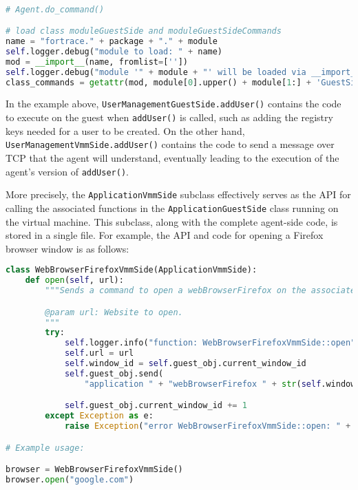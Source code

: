 \documentclass[letterpaper,12pt]{report}
\newcommand{\passthrough}[1]{#1}
\begin{document}
\begin{lstlisting}[language=Python]

# Agent.do_command()

# load class moduleGuestSide and moduleGuestSideCommands
name = "fortrace." + package + "." + module
self.logger.debug("module to load: " + name)
mod = __import__(name, fromlist=[''])
self.logger.debug("module '" + module + "' will be loaded via __import__")
class_commands = getattr(mod, module[0].upper() + module[1:] + 'GuestSideCommands')
\end{lstlisting}

In the example above,
\passthrough{\lstinline!UserManagementGuestSide.addUser()!} contains the
code to execute on the guest when \passthrough{\lstinline!addUser()!} is
called, such as adding the registry keys needed for a user to be
created. On the other hand,
\passthrough{\lstinline!UserManagementVmmSide.addUser()!} contains the
code to send a message over TCP that the agent will understand,
eventually leading to the execution of the agent's version of
\passthrough{\lstinline!addUser()!}.

More precisely, the \passthrough{\lstinline!ApplicationVmmSide!}
subclass effectively serves as the API for calling the associated
functions in the \passthrough{\lstinline!ApplicationGuestSide!} class
running on the virtual machine. This subclass, along with the complete
agent-side code, is stored in a single file. For example, the API and
code for opening a Firefox browser window is as follows:

\begin{lstlisting}[language=Python]
class WebBrowserFirefoxVmmSide(ApplicationVmmSide):
    def open(self, url):
        """Sends a command to open a webBrowserFirefox on the associated guest.

        @param url: Website to open.
        """
        try:
            self.logger.info("function: WebBrowserFirefoxVmmSide::open")
            self.url = url
            self.window_id = self.guest_obj.current_window_id
            self.guest_obj.send(
                "application " + "webBrowserFirefox " + str(self.window_id) + " open " + self.webBrowserFirefox + " " + self.url)

            self.guest_obj.current_window_id += 1
        except Exception as e:
            raise Exception("error WebBrowserFirefoxVmmSide::open: " + str(e))

# Example usage:

browser = WebBrowserFirefoxVmmSide()
browser.open("google.com")
\end{lstlisting}
\end{document}
